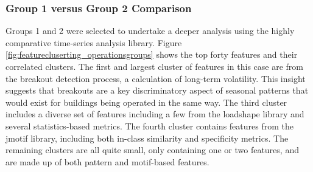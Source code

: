 \subsubsection{Group 1 versus Group 2 Comparison}
\label{sec:group1vsgroup2}

Groups 1 and 2 were selected to undertake a deeper analysis using the highly comparative time-series analysis library. Figure \ref{fig:featurecluserting_operationsgroups} shows the top forty features and their correlated clusters. The first and largest cluster of features in this case are from the breakout detection process, a calculation of long-term volatility. This insight suggests that breakouts are a key discriminatory aspect of seasonal patterns that would exist for buildings being operated in the same way. The third cluster includes a diverse set of features including a few from the loadshape library and several statistics-based metrics. The fourth cluster contains features from the jmotif library, including both in-class similarity and specificity metrics. The remaining clusters are all quite small, only containing one or two features, and are made up of both pattern and motif-based features.